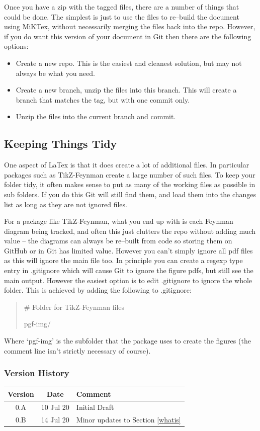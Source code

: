 \documentclass[a4paper, 12pt]{article}
\begin{document}
Once you have a zip with the tagged files, there are a number of things that could be done. The simplest is just to use the files to re--build the document using MiKTex, without necessarily merging the files back into the repo. However, if you do want this version of your document in Git then there are the following options:
\begin{itemize}
\item Create a new repo. This is the easiest and cleanest solution, but may not always be what you need.
\item Create a new branch, unzip the files into this branch. This will create a branch that matches the tag, but with one commit only.
\item Unzip the files into the current branch and commit.
\end{itemize}


\subsection{Keeping Things Tidy}
One aspect of LaTex is that it does create a lot of additional files. In particular packages such as TikZ-Feynman create a large number of such files. To keep your folder tidy, it often makes sense to put as many of the working files as possible in sub folders. If you do this Git will still find them, and load them into the changes list as long as they are not ignored files.

For a package like TikZ-Feynman, what you end up with is each Feynman diagram being tracked, and often this just clutters the repo without adding much value -- the diagrams can always be re--built from code so storing them on GitHub or in Git has limited value. However you can't simply ignore all pdf files as this will ignore the main file too. In principle you can create a regexp type entry in .gitignore which will cause Git to ignore the figure pdfs, but still see the main output. However the easiest option is to edit .gitignore to ignore the whole folder. This is achieved by adding the following to .gitignore:
\begin{quote}\setlength{\parskip}{0pt}
\# Folder for TikZ-Feynman files

pgf-img/
\end{quote}
Where `pgf-img' is the subfolder that the package uses to create the figures (the comment line isn't strictly necessary of course).

\subsubsection*{Version History}
\renewcommand{\arraystretch}{1.2}
\begin{table}[h]
\begin{tabular}{|c|c|p{60mm}|}
\hline
Version&Date&Comment\\
\hline
0.A&10 Jul 20&Initial Draft\\
\hline
0.B&14 Jul 20&Minor updates to Section \ref{whatis}\\
\hline
\end{tabular}
\end{table}
\end{document}
